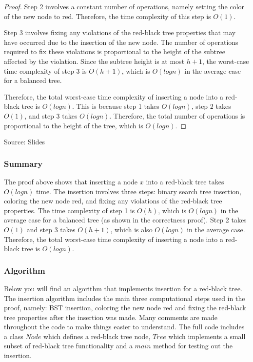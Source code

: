 \documentclass[10pt]{article}
\begin{document}
\begin{proof}
    \spacing
    \noindent
    Step 2 involves a constant number of operations, namely setting the color of
    the new node to red. Therefore, the time complexity of this step is $O(1)$.

    \spacing
    \noindent
    Step 3 involves fixing any violations of the red-black tree properties that
    may have occurred due to the insertion of the new node. The number of operations
    required to fix these violations is proportional to the height of the subtree
    affected by the violation. Since the subtree height is at most $h+1$, the worst-case
    time complexity of step 3 is $O(h+1)$, which is $O(log n)$ in the average
    case for a balanced tree.

    \spacing
    \noindent
    Therefore, the total worst-case time complexity of inserting a node into a red-black
    tree is $O(log n)$. This is because step 1 takes $O(log n)$, step 2 takes $O(
    1)$, and step 3 takes $O(log n)$. Therefore, the total number of operations
    is proportional to the height of the tree, which is $O(log n)$.
  \end{proof}

  \noindent
  Source: Slides

  \subsubsection*{Summary}


  The proof above shows that inserting a node $x$ into a red-black tree takes $O(
  logn)$ time. The insertion involves three steps: binary search tree insertion,
  coloring the new node red, and fixing any violations of the red-black tree properties.
  The time complexity of step 1 is $O(h)$, which is $O(logn)$ in the average case
  for a balanced tree (as shown in the correctness proof). Step 2 takes $O(1)$
  and step 3 takes $O(h+1)$, which is also $O(logn)$ in the average case.
  Therefore, the total worst-case time complexity of inserting a node into a red-black
  tree is $O(logn)$.

  \subsubsection*{Algorithm}


  Below you will find an algorithm that implements insertion for a red-black tree.
  The insertion algorithm includes the main three computational steps used in
  the proof, namely: BST insertion, coloring the new node red and fixing the red-black
  tree properties after the insertion was made. Many comments are made
  throughout the code to make things easier to understand. The full code includes
  a class $Node$ which defines a red-black tree node, $Tree$ which implements a
  small subset of red-black tree functionality and a $main$ method for testing
  out the insertion.
\end{document}

